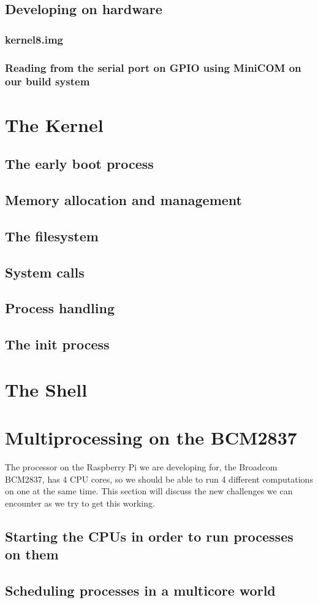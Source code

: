 \documentclass{article}
\begin{document}
\subsection{Developing on hardware}
\subsubsection{kernel8.img}
\subsubsection{Reading from the serial port on GPIO using MiniCOM on our build
system}

\clearpage
\section{The Kernel}
\subsection{The early boot process}
\subsection{Memory allocation and management}
\subsection{The filesystem}
\subsection{System calls}
\subsection{Process handling}
\subsection{The init process}

\clearpage
\section{The Shell}

\clearpage
\section{Multiprocessing on the BCM2837}
The processor on the Raspberry Pi we are developing for, the Broadcom BCM2837,
has 4 CPU cores, so we should be able to run 4 different computations on one at
the same time. This section will discuss the new challenges we can encounter as
we try to get this working.
\subsection{Starting the CPUs in order to run processes on them}
\subsection{Scheduling processes in a multicore world}
\end{document}
